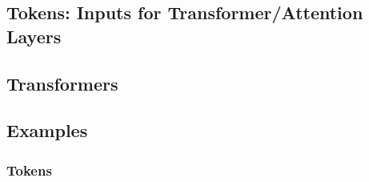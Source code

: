 \begin{motivation}

\end{motivation}

\subsection{Tokens: Inputs for Transformer/Attention Layers}
\begin{definition}
    
\end{definition}

\subsection{Transformers}
\begin{notes}

\end{notes}

\subsection{Examples}
\subsubsection{Tokens}
\begin{example}
    
\end{example}
